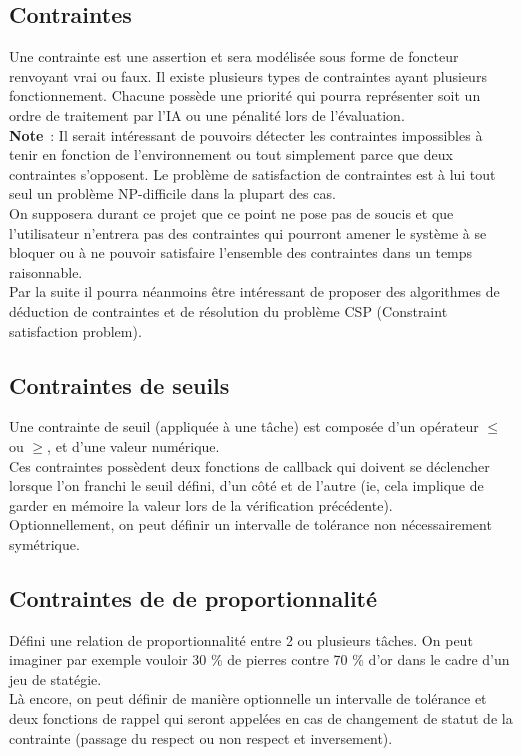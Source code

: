 \subsection{Contraintes}

Une contrainte est une assertion et sera modélisée sous forme de foncteur renvoyant vrai ou faux.
Il existe plusieurs types de contraintes ayant plusieurs fonctionnement. Chacune possède une priorité qui pourra représenter soit un ordre de traitement par l'IA ou une pénalité lors de l'évaluation. \\

\textbf{Note}~: Il serait intéressant de pouvoirs détecter les contraintes impossibles à tenir en fonction de l'environnement ou tout simplement parce que deux contraintes s'opposent. Le problème de satisfaction de contraintes est à lui tout seul un problème NP-difficile dans la plupart des cas.\\
\indent On supposera durant ce projet que ce point ne pose pas de soucis et que l'utilisateur n'entrera pas des contraintes qui pourront amener le système à se bloquer ou à ne pouvoir satisfaire l'ensemble des contraintes dans un temps raisonnable.\\
\indent Par la suite il pourra néanmoins être intéressant de proposer des algorithmes de déduction de contraintes et de résolution du problème CSP (Constraint satisfaction problem).

\subsection{Contraintes de seuils}

Une contrainte de seuil (appliquée à une tâche) est composée d'un opérateur $\leq$ ou $\geq$, et d'une valeur numérique.\\
\indent Ces contraintes possèdent deux fonctions de callback qui doivent se déclencher lorsque l'on franchi le seuil défini, d'un côté et de l'autre (ie, cela implique de garder en mémoire la valeur lors de la vérification précédente).\\
\indent Optionnellement, on peut définir un intervalle de tolérance non nécessairement symétrique.

\subsection{Contraintes de de proportionnalité}

Défini une relation de proportionnalité entre 2 ou plusieurs tâches.
On peut imaginer par exemple vouloir 30 \% de pierres contre 70 \% d'or dans le cadre d'un jeu de statégie.\\
\indent Là encore, on peut définir de manière optionnelle un intervalle de tolérance et deux fonctions de rappel qui seront appelées en cas de changement de statut de la contrainte (passage du respect ou non respect et inversement).

